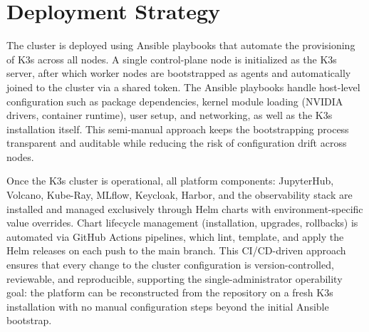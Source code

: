 \section{Deployment Strategy}

The cluster is deployed using Ansible playbooks that automate the provisioning of K3s across all nodes. A single control-plane node is initialized as the K3s server, after which worker nodes are bootstrapped as agents and automatically joined to the cluster via a shared token. The Ansible playbooks handle host-level configuration such as package dependencies, kernel module loading (NVIDIA drivers, container runtime), user setup, and networking, as well as the K3s installation itself. This semi-manual approach keeps the bootstrapping process transparent and auditable while reducing the risk of configuration drift across nodes.

Once the K3s cluster is operational, all platform components: JupyterHub, Volcano, Kube-Ray, MLflow, Keycloak, Harbor, and the observability stack are installed and managed exclusively through Helm charts with environment-specific value overrides. Chart lifecycle management (installation, upgrades, rollbacks) is automated via GitHub Actions pipelines, which lint, template, and apply the Helm releases on each push to the main branch. This CI/CD-driven approach ensures that every change to the cluster configuration is version-controlled, reviewable, and reproducible, supporting the single-administrator operability goal: the platform can be reconstructed from the repository on a fresh K3s installation with no manual configuration steps beyond the initial Ansible bootstrap.
